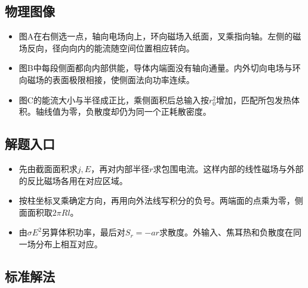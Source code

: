 \documentclass[UTF8,fontset=fandol,a4paper,11pt]{ctexart}
\begin{document}


\subsection*{物理图像}

\begin{itemize}
\item 图A在右侧选一点，轴向电场向上，环向磁场入纸面，叉乘指向轴。左侧的磁场反向，径向向内的能流随空间位置相应转向。
\item 图B中每段侧面都向内部供能，导体内端面没有轴向通量。内外切向电场与环向磁场的表面极限相接，使侧面法向功率连续。
\item 图C的能流大小与半径成正比，乘侧面积后总输入按$r_0^2$增加，匹配所包发热体积。轴线值为零，负散度却仍为同一个正耗散密度。
\end{itemize}



\subsection*{解题入口}

\begin{itemize}
\item 先由截面面积求$j,E$，再对内部半径$r$求包围电流。这样内部的线性磁场与外部的反比磁场各用在对应区域。
\item 按柱坐标叉乘确定方向，再用向外法线写积分的负号。两端面的点乘为零，侧面面积取$2\pi Rl$。
\item 由$\sigma E^2$另算体积功率，最后对$S_r=-ar$求散度。外输入、焦耳热和负散度在同一场分布上相互对应。
\end{itemize}



\subsection*{标准解法}
\end{document}
